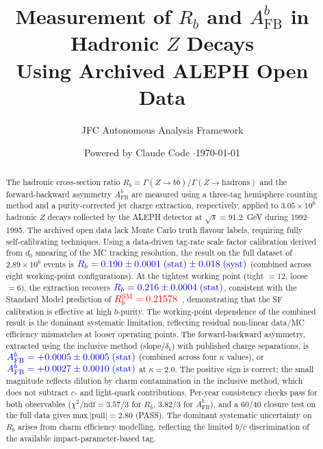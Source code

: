 \documentclass[11pt,a4paper]{article}
\title{Measurement of $R_b$ and $A_\text{FB}^b$ in Hadronic $Z$ Decays\\
Using Archived ALEPH Open Data}
\author{JFC Autonomous Analysis Framework}
\date{Powered by Claude Code \quad$\cdot$\quad \today}
\newcommand{\measured}[1]{\textcolor{blue}{#1}}
\newcommand{\external}[1]{\textcolor{red}{#1}}
\begin{document}
\maketitle

\begin{abstract}
The hadronic cross-section ratio
$R_b = \Gamma(Z \to b\bar{b}) / \Gamma(Z \to \text{hadrons})$
and the forward-backward asymmetry $A_\text{FB}^b$ are measured using
a three-tag hemisphere counting method and a purity-corrected jet
charge extraction, respectively, applied to $3.05 \times 10^6$
hadronic $Z$ decays collected by the ALEPH detector at
$\sqrt{s} = 91.2$~GeV during 1992--1995.
The archived open data lack Monte Carlo truth flavour labels,
requiring fully self-calibrating techniques.
Using a data-driven tag-rate scale factor calibration derived from
$d_0$ smearing of the MC tracking resolution, the result on the
full dataset of $2.89 \times 10^6$ events is
$\measured{R_b = 0.190 \pm 0.0001\;\text{(stat)} \pm 0.018\;\text{(syst)}}$
(combined across eight working-point configurations).
At the tightest working point (tight $= 12$, loose $= 6$), the
extraction recovers
$\measured{R_b = 0.216 \pm 0.0004\;\text{(stat)}}$,
consistent with the Standard Model prediction of
$\external{R_b^\text{SM} = 0.21578}$~\cite{LEP:EWWG:2005},
demonstrating that the SF calibration is effective at high
$b$-purity.
The working-point dependence of the combined result is the
dominant systematic limitation, reflecting residual non-linear
data/MC efficiency mismatches at looser operating points.
The forward-backward asymmetry, extracted using the inclusive
method (slope$/\delta_b$) with published charge separations,
is
$\measured{A_\text{FB}^b = +0.0005 \pm 0.0005\;\text{(stat)}}$
(combined across four $\kappa$ values),
or $\measured{A_\text{FB}^b = +0.0027 \pm 0.0010\;\text{(stat)}}$
at $\kappa = 2.0$.
The positive sign is correct; the small magnitude reflects dilution
by charm contamination in the inclusive method, which does not
subtract $c$- and light-quark contributions.
Per-year consistency checks pass for both observables
($\chi^2/\text{ndf} = 3.57/3$ for $R_b$, $3.82/3$ for
$A_\text{FB}^b$), and a 60/40 closure test on the full data gives
$\text{max}\,|{\text{pull}}| = 2.80$ (PASS).
The dominant systematic uncertainty on $R_b$ arises from charm
efficiency modelling, reflecting the limited $b$/$c$ discrimination
of the available impact-parameter-based tag.
\end{abstract}
\end{document}
